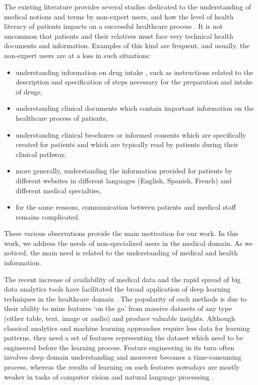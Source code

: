 The existing literature provides several studies dedicated to the understanding of medical notions and terms by non-expert users, and how the level of health literacy of patients impacts on a successful healthcare process \citep{McCray-JAMIA2005, Eysenbach-JMIR2007}. It is not uncommon that patients and their relatives must face very technical health documents and information. Examples of this kind are frequent, and usually, the non-expert users are at a loss in such situations:

\begin{itemize}
    \item  understanding information on drug intake \citep{VanderStichele-WILEY1999, Patel-IJMI2002}, such as instructions related to the description and specification of steps necessary for the preparation and intake of drugs,
    
    \item  understanding clinical documents \citep{Zeng-MEDINFO2007} which contain important information on the healthcare process of patients,
    
    \item  understanding clinical brochures or informed consents \citep{Williams-JAMA1995} which are specifically created for patients and which are typically read by patients during their clinical pathway,
    
    \item  more generally, understanding the information provided for patients by different websites \citep{Oregon-2008, Brigo-EB2015} in different languages (English, Spanish, French) and different medical specialties,
    
    \item for the same reasons, communication between patients and medical staff \citep{Jucks-HC2007, Tran-EC2009} remains complicated.
\end{itemize}
These various observations provide the main motivation for our work. In this work, we address the needs of non-specialized users in the medical domain. As we noticed, the main need is related to the understanding of medical and health information. 

The recent increase of availability of medical data and the rapid spread of big data analytics tools have facilitated the broad application of deep learning techniques in the healthcare domain \citep{Jiang-BMJ2017}. The popularity of such methods is due to their ability to mine features `on the go' from massive datasets of any type (either table, text, image or audio) and produce valuable insights. Although classical analytics and machine learning approaches require less data for learning patterns, they need a set of features representing the dataset which need to be engineered before the learning process. Feature engineering in its turn often involves deep domain understanding and moreover becomes a time-consuming process, whereas the results of learning on such features nowadays are mostly weaker in tasks of computer vision and natural language processing \citep{Krizhevsky-NIPS2012, Zhang-NIPS2015}.   

